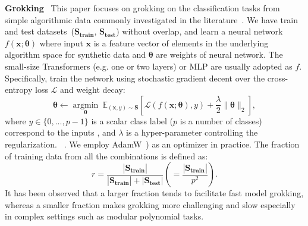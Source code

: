 \documentclass[10pt]{article} %
\newcommand{\update}[1]{{\color{black}{#1}}}
\begin{document}
\textbf{Grokking}~
This paper focuses on grokking on the classification tasks from simple algorithmic data commonly investigated in the literature~\citep{power2022grokking,liu2022understanding,barak2022hidden}.
We have train and test datasets~($\boldsymbol{S_{\text{train}}}$, $\boldsymbol{S_{\text{test}}}$) without overlap, and learn a neural network $f(\boldsymbol{x};\boldsymbol{\theta})$ where input $\boldsymbol{x}$ is a feature vector of elements in the underlying algorithm space for synthetic data and $\boldsymbol{\theta}$ are weights of neural network.
The small-size Transformers (e.g. one or two layers) or MLP are usually adopted as $f$.
Specifically, \update{prior works} train the network using stochastic gradient decent over the cross-entropy loss $\mathcal{L}$ and weight decay:
\begin{equation}
    \boldsymbol{\theta} \leftarrow \underset{{\boldsymbol{\theta}}}{\operatorname{argmin}}~\mathbb{E}_{(\boldsymbol{x},y)\sim \boldsymbol{S}} \left[  \mathcal{L}(f(\boldsymbol{x}; \boldsymbol{\theta}), y) + \frac{\lambda}{2}\|\boldsymbol{\theta} \|_2 \right],
\nonumber
\end{equation}
where $y \in \{ 0, . . . , p - 1 \}$ is a scalar class label ($p$ is a number of classes) correspond to the inputs \update{$\boldsymbol{x} \in \{ 0, . . . , p - 1 \} \times \{ 0, . . . , p - 1 \}$}, and $\lambda$ is a hyper-parameter controlling the regularization.
\update{The weight decay is one of the factors inducing the grokking phenomenon}~\citep{power2022grokking,liu2023omnigrok,varma2023explaining}. We employ AdamW~\citep{loshchilov2018decoupled}) as an optimizer in practice.
The fraction of training data from all the combinations is defined as:
\begin{equation}
    r = \frac{|\boldsymbol{S_{\text{train}}}|}{|\boldsymbol{S_{\text{train}}}|+|\boldsymbol{S_{\text{test}}}|} \left( = \frac{|\boldsymbol{S_{\text{train}}}|}{p^2} \right).
    \nonumber
\end{equation}
It has been observed that a larger fraction tends to facilitate fast model grokking, whereas a smaller fraction makes grokking more challenging and slow especially in complex settings such as modular polynomial tasks.
\end{document}
